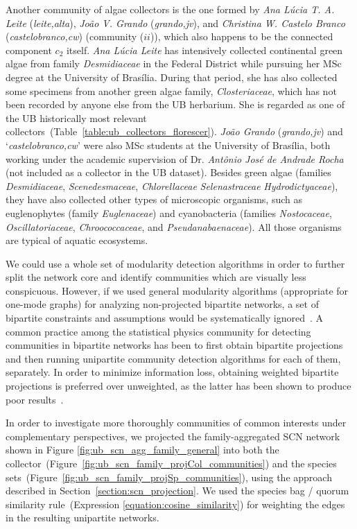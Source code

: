Another community of algae collectors is the one formed by \textit{Ana Lúcia T. A. Leite} (\textit{leite,alta}), \textit{João V. Grando} (\textit{grando,jv}), and  \textit{Christina W. Castelo Branco} (\textit{castelobranco,cw}) (community ($ii$)), which also happens to be the connected component $c_2$ itself.
\textit{Ana Lúcia Leite} has intensively collected continental green algae from family \textit{Desmidiaceae} in the Federal District while pursuing her MSc degree at the University of Brasília.
During that period, she has also collected some specimens from another green algae family, \textit{Closteriaceae}, which has not been recorded by anyone else from the UB herbarium.
She is regarded as one of the UB historically most relevant collectors~(Table~\ref{table:ub_collectors_florescer}).
%
\textit{João Grando} (\textit{grando,jv}) and `\textit{castelobranco,cw}' were also MSc students at the University of Brasília, both working under the academic supervision of Dr. \textit{Antônio José de Andrade Rocha} (not included as a collector in the UB dataset).
Besides green algae (families \textit{Desmidiaceae}, \textit{Scenedesmaceae}, \textit{Chlorellaceae} \textit{Selenastraceae} \textit{Hydrodictyaceae}), they have also collected other types of microscopic organisms, such as euglenophytes (family \textit{Euglenaceae}) and cyanobacteria (families \textit{Nostocaceae}, \textit{Oscillatoriaceae}, \textit{Chroococcaceae}, and \textit{Pseudanabaenaceae}). 
All those organisms are typical of aquatic ecosystems.
 
We could use a whole set of modularity detection algorithms in order to further split the network core and identify communities which are visually less conspicuous. 
However, if we used general modularity algorithms (appropriate for one-mode graphs) for analyzing non-projected bipartite networks, a set of bipartite constraints and assumptions would be systematically ignored~\cite{Borgatti2015}.
A common practice among the statistical physics community for detecting communities in bipartite networks has been to first obtain bipartite projections and then running unipartite community detection algorithms for each of them, separately.
In order to minimize information loss, obtaining weighted bipartite projections is preferred over unweighted, as the latter has been shown to produce poor results~\cite{Guimera2007}.

In order to investigate more thoroughly communities of common interests under complementary perspectives, we projected the family-aggregated SCN network shown in Figure \ref{fig:ub_scn_agg_family_general} into both the collector~(Figure~\ref{fig:ub_scn_family_projCol_communities}) and the species sets~(Figure~\ref{fig:ub_scn_family_projSp_communities}), using the approach described in Section~\ref{section:scn_projection}.
We used the species bag / quorum similarity rule~(Expression \ref{equation:cosine_similarity}) for weighting the edges in the resulting unipartite networks.


